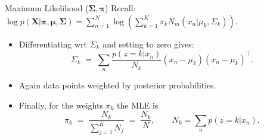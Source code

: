 \documentclass[11pt,handout,aspectratio=169]{beamer}
\begin{document}


\begin{frame}{Maximum Likelihood ($\boldsymbol \Sigma,\boldsymbol \pi$)}
Recall: $\log p(\boldsymbol X|\boldsymbol\pi,\boldsymbol\mu,\boldsymbol\Sigma)=\sum_{n=1}^N\log\left(\sum_{k=1}^K\pi_k N_m(x_n|\mu_k,\Sigma_k)\right)$.
\begin{itemize}
	\item Differentiating wrt $\Sigma_k$ and setting to zero gives:
	$$\Sigma_k\;=\;\sum_n \frac{p(z=k|x_n)}{N_k}(x_n-\mu_k)(x_n-\mu_k)^\top.$$
	\item Again data points weighted by posterior probabilities.\\[.4cm]
	\item Finally, for the weights $\pi_k$ the MLE is
$$
\pi_k\;=\;\frac{N_k}{\sum_{j=1}^K N_j}\;=\;\frac{N_k}{N},\qquad N_k=\sum_n p(z=k|x_n).
$$
\end{itemize}
\end{frame}



\end{document}
